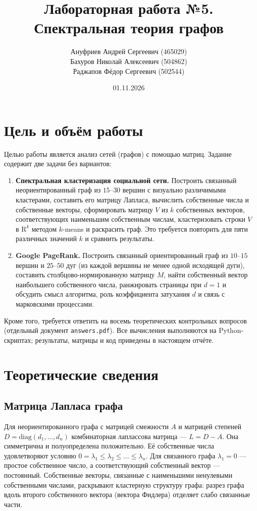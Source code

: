 \documentclass[12pt,a4paper]{article}
\title{Лабораторная работа №5. Спектральная теория графов}
\author{Ануфриев Андрей Сергеевич (465029) \\ Бахуров Николай Алексеевич (504862) \\ Раджапов Фёдор Сергеевич (502544)}
\date{01.11.2026}
\begin{document}
\maketitle
\tableofcontents

\section{Цель и объём работы}

Целью работы является анализ сетей (графов) с помощью матриц. Задание содержит две задачи без вариантов:
\begin{enumerate}
    \item \textbf{Спектральная кластеризация социальной сети.} Построить связанный неориентированный граф из $15$--$30$ вершин с визуально различимыми кластерами, составить его матрицу Лапласа, вычислить собственные числа и собственные векторы, сформировать матрицу $V$ из $k$ собственных векторов, соответствующих наименьшим собственным числам, кластеризовать строки $V$ в $\mathrm{R}^{k}$ методом $k$-means и раскрасить граф. Это требуется повторить для пяти различных значений $k$ и сравнить результаты.
    \item \textbf{Google PageRank.} Построить связанный ориентированный граф из $10$--$15$ вершин и $25$--$50$ дуг (из каждой вершины не менее одной исходящей дуги), составить столбцово-нормированную матрицу $M$, найти собственный вектор наибольшего собственного числа, ранжировать страницы при $d=1$ и обсудить смысл алгоритма, роль коэффициента затухания $d$ и связь с марковскими процессами.
\end{enumerate}
Кроме того, требуется ответить на восемь теоретических контрольных вопросов (отдельный документ \texttt{answers.pdf}). Все вычисления выполняются на Python-скриптах; результаты, матрицы и код приведены в настоящем отчёте.

\section{Теоретические сведения}

\subsection{Матрица Лапласа графа}
Для неориентированного графа с матрицей смежности $A$ и матрицей степеней $D=\mathrm{diag}(d_1,\dots,d_n)$ комбинаторная лаплассова матрица --- $L=D-A$. Она симметрична и полуопределена положительно. Её собственные числа удовлетворяют условию $0=\lambda_1\le\lambda_2\le\dots\le\lambda_n$. Для связанного графа $\lambda_1=0$ --- простое собственное число, а соответствующий собственный вектор --- постоянный. Собственные векторы, связанные с наименьшими ненулевыми собственными числами, раскрывают кластерную структуру графа: разрез графа вдоль второго собственного вектора (вектора Фидлера) отделяет слабо связанные части.
\end{document}
